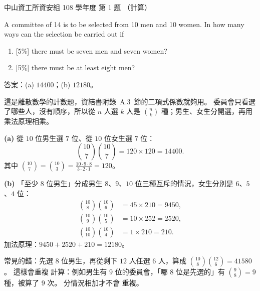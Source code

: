 \begin{pastexam}[label={px:nsysu-108-dmalg-01}]{中山資工所資安組 108 學年度 第 1 題}
（計算）

A committee of 14 is to be selected from 10 men and 10 women. In how many ways can the selection be
carried out if
\begin{enumerate}[label=(\alph*)]
\item {[5\%]} there must be seven men and seven women?
\item {[5\%]} there must be at least eight men?
\end{enumerate}
\end{pastexam}

\begin{pastsoln}
答案：(a) $14400$；(b) $12180$。

這是離散數學的計數題，資結書附錄~A.3~節的二項式係數就夠用。 委員會只看選了哪些人，沒有順序，所以從
$n$ 人選 $k$ 人是 $\binom{n}{k}$ 種；男生、女生分開選，再用乘法原理相乘。

\textbf{(a)} 從 $10$ 位男生選 $7$ 位、從 $10$ 位女生選 $7$ 位：
\[
\binom{10}{7}\binom{10}{7} = 120 \times 120 = 14400 .
\]
其中 $\binom{10}{7} = \binom{10}{3} = \frac{10 \cdot 9 \cdot 8}{3 \cdot 2 \cdot 1} = 120$。

\textbf{(b)} 「至少 $8$ 位男生」分成男生 $8$、$9$、$10$ 位三種互斥的情況，女生分別是 $6$、$5$、$4$ 位：
\begin{align*}
\binom{10}{8}\binom{10}{6} &= 45 \times 210 = 9450,\\
\binom{10}{9}\binom{10}{5} &= 10 \times 252 = 2520,\\
\binom{10}{10}\binom{10}{4} &= 1 \times 210 = 210 .
\end{align*}
加法原理：$9450 + 2520 + 210 = 12180$。

常見的錯：先選 $8$ 位男生，再從剩下 $12$ 人任選 $6$ 人，算成 $\binom{10}{8}\binom{12}{6} = 41580$。 這樣會重複
計算：例如男生有 $9$ 位的委員會，「哪 $8$ 位是先選的」有 $\binom{9}{8} = 9$ 種，被算了 $9$ 次。 分情況相加才不會
重複。
\end{pastsoln}
